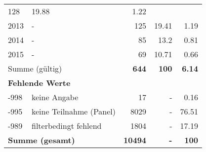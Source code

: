 \begin{longtable}{lXrrr}
       \num{128} &
       \num[round-mode=places,round-precision=2]{19,88} &
         \num[round-mode=places,round-precision=2]{1,22} \\

     2013 &
     \multicolumn{1}{X}{ -  } &


       \num{125} &
       \num[round-mode=places,round-precision=2]{19,41} &
         \num[round-mode=places,round-precision=2]{1,19} \\

     2014 &
     \multicolumn{1}{X}{ -  } &


       \num{85} &
       \num[round-mode=places,round-precision=2]{13,2} &
         \num[round-mode=places,round-precision=2]{0,81} \\

     2015 &
     \multicolumn{1}{X}{ -  } &


       \num{69} &
       \num[round-mode=places,round-precision=2]{10,71} &
         \num[round-mode=places,round-precision=2]{0,66} \\
     \midrule
     \multicolumn{2}{l}{Summe (gültig)} &
       \textbf{\num{644}} &
     \textbf{100} &
       \textbf{\num[round-mode=places,round-precision=2]{6,14}} \\
     \multicolumn{5}{l}{\textbf{Fehlende Werte}}\\
       -998 &
       keine Angabe &
         \num{17} &
        - &
         \num[round-mode=places,round-precision=2]{0,16} \\
       -995 &
       keine Teilnahme (Panel) &
         \num{8029} &
        - &
         \num[round-mode=places,round-precision=2]{76,51} \\
       -989 &
       filterbedingt fehlend &
         \num{1804} &
        - &
         \num[round-mode=places,round-precision=2]{17,19} \\
     \midrule
     \multicolumn{2}{l}{\textbf{Summe (gesamt)}} &
          \textbf{\num{10494}} &
        \textbf{-} &
        \textbf{100} \\
     \bottomrule
     \end{longtable}
     
